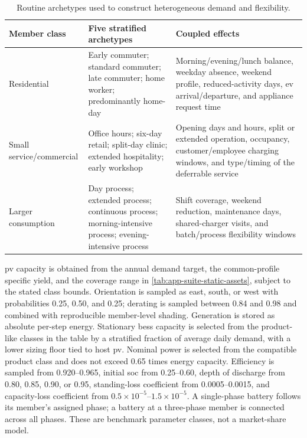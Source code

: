 \begin{table}[htbp]
\centering
\caption{Routine archetypes used to construct heterogeneous demand and flexibility.}
\label{tab:app-suite-routines}
\scriptsize
\begin{tabularx}{\textwidth}{@{}>{\RaggedRight\arraybackslash}p{}>{\RaggedRight\arraybackslash}p{}X@{}}
\toprule
\textbf{Member class} & \textbf{Five stratified archetypes} & \textbf{Coupled effects} \\
\midrule
Residential & Early commuter; standard commuter; late commuter; home worker; predominantly home-day & Morning/evening/lunch balance, weekday absence, weekend profile, reduced-activity days, \gls{ev} arrival/departure, and appliance request time \\
Small service/commercial & Office hours; six-day retail; split-day clinic; extended hospitality; early workshop & Opening days and hours, split or extended operation, occupancy, customer/employee charging windows, and type/timing of the deferrable service \\
Larger consumption & Day process; extended process; continuous process; morning-intensive process; evening-intensive process & Shift coverage, weekend reduction, maintenance days, shared-charger visits, and batch/process flexibility windows \\
\bottomrule
\end{tabularx}
\end{table}

\gls{pv} capacity is obtained from the annual demand target, the common-profile specific yield, and the coverage range in \cref{tab:app-suite-static-assets}, subject to the stated class bounds. Orientation is sampled as east, south, or west with probabilities 0.25, 0.50, and 0.25; derating is sampled between 0.84 and 0.98 and combined with reproducible member-level shading. Generation is stored as absolute per-step energy. Stationary \gls{bess} capacity is selected from the product-like classes in the table by a stratified fraction of average daily demand, with a lower sizing floor tied to host \gls{pv}. Nominal power is selected from the compatible product class and does not exceed 0.65 times energy capacity. Efficiency is sampled from 0.920--0.965, initial \gls{soc} from 0.25--0.60, depth of discharge from 0.80, 0.85, 0.90, or 0.95, standing-loss coefficient from 0.0005--0.0015, and capacity-loss coefficient from $0.5\times10^{-5}$--$1.5\times10^{-5}$. A single-phase battery follows its member's assigned phase; a battery at a three-phase member is connected across all phases. These are benchmark parameter classes, not a market-share model.

